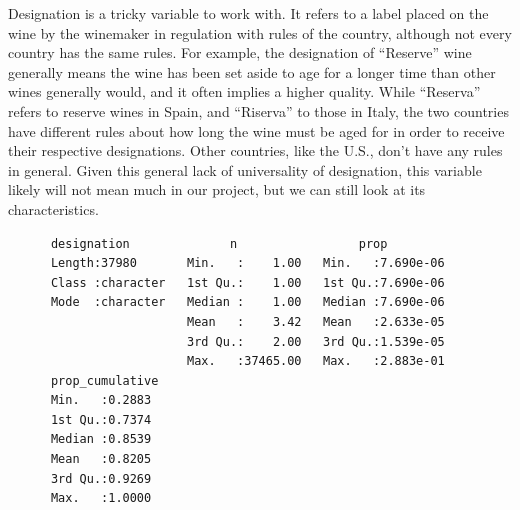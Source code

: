 \documentclass[12pt,twoside]{amherstthesis}
\newenvironment{Shaded}{\begin{snugshade}}{\end{snugshade}}
\newcommand{\KeywordTok}[1]{\textcolor[rgb]{0.13,0.29,0.53}{\textbf{#1}}}
\newcommand{\DataTypeTok}[1]{\textcolor[rgb]{0.13,0.29,0.53}{#1}}
\newcommand{\StringTok}[1]{\textcolor[rgb]{0.31,0.60,0.02}{#1}}
\newcommand{\OtherTok}[1]{\textcolor[rgb]{0.56,0.35,0.01}{#1}}
\newcommand{\OperatorTok}[1]{\textcolor[rgb]{0.81,0.36,0.00}{\textbf{#1}}}
\newcommand{\NormalTok}[1]{#1}
\begin{document}
Designation is a tricky variable to work with. It refers to a label
placed on the wine by the winemaker in regulation with rules of the
country, although not every country has the same rules. For example, the
designation of ``Reserve'' wine generally means the wine has been set
aside to age for a longer time than other wines generally would, and it
often implies a higher quality. While ``Reserva'' refers to reserve
wines in Spain, and ``Riserva'' to those in Italy, the two countries
have different rules about how long the wine must be aged for in order
to receive their respective designations. Other countries, like the
U.S., don't have any rules in general. Given this general lack of
universality of designation, this variable likely will not mean much in
our project, but we can still look at its characteristics.
\begin{Shaded}
\end{Shaded}
\begin{verbatim}
      designation              n                 prop          
      Length:37980       Min.   :    1.00   Min.   :7.690e-06  
      Class :character   1st Qu.:    1.00   1st Qu.:7.690e-06  
      Mode  :character   Median :    1.00   Median :7.690e-06  
                         Mean   :    3.42   Mean   :2.633e-05  
                         3rd Qu.:    2.00   3rd Qu.:1.539e-05  
                         Max.   :37465.00   Max.   :2.883e-01  
      prop_cumulative 
      Min.   :0.2883  
      1st Qu.:0.7374  
      Median :0.8539  
      Mean   :0.8205  
      3rd Qu.:0.9269  
      Max.   :1.0000
\end{verbatim}
\begin{Shaded}
\end{Shaded}
\end{document}
